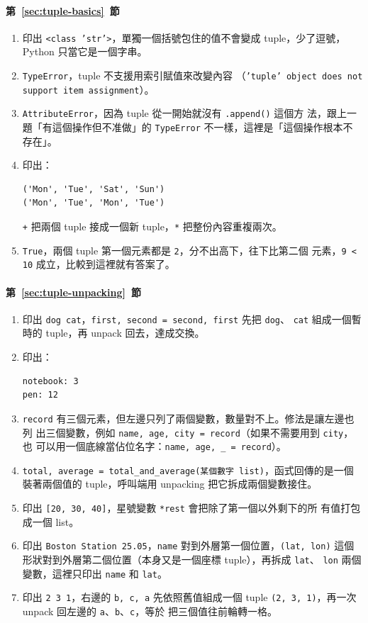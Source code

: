\paragraph{第~\ref{sec:tuple-basics}~節}
\begin{enumerate}
\item 印出 \texttt{<class 'str'>}，單獨一個括號包住的值不會變成 tuple，少了逗號，
Python 只當它是一個字串。
\item \texttt{TypeError}，tuple 不支援用索引賦值來改變內容
（\texttt{'tuple' object does not support item assignment}）。
\item \texttt{AttributeError}，因為 tuple 從一開始就沒有 \texttt{.append()} 這個方
法，跟上一題「有這個操作但不准做」的 \texttt{TypeError} 不一樣，這裡是「這個操作根本不
存在」。
\item 印出：
\begin{verbatim}
('Mon', 'Tue', 'Sat', 'Sun')
('Mon', 'Tue', 'Mon', 'Tue')
\end{verbatim}
\texttt{+} 把兩個 tuple 接成一個新 tuple，\texttt{*} 把整份內容重複兩次。
\item \texttt{True}，兩個 tuple 第一個元素都是 \texttt{2}，分不出高下，往下比第二個
元素，\texttt{9 < 10} 成立，比較到這裡就有答案了。
\end{enumerate}

\paragraph{第~\ref{sec:tuple-unpacking}~節}
\begin{enumerate}
\item 印出 \texttt{dog cat}，\texttt{first, second = second, first} 先把 \texttt{dog}、
\texttt{cat} 組成一個暫時的 tuple，再 unpack 回去，達成交換。
\item 印出：
\begin{verbatim}
notebook: 3
pen: 12
\end{verbatim}
\item \texttt{record} 有三個元素，但左邊只列了兩個變數，數量對不上。修法是讓左邊也列
出三個變數，例如 \texttt{name, age, city = record}（如果不需要用到 \texttt{city}，也
可以用一個底線當佔位名字：\texttt{name, age, \_ = record}）。
\item \texttt{total, average = total\_and\_average(某個數字 list)}，函式回傳的是一個
裝著兩個值的 tuple，呼叫端用 unpacking 把它拆成兩個變數接住。
\item 印出 \texttt{[20, 30, 40]}，星號變數 \texttt{*rest} 會把除了第一個以外剩下的所
有值打包成一個 list。
\item 印出 \texttt{Boston Station 25.05}，\texttt{name} 對到外層第一個位置，\texttt{(lat, lon)}
這個形狀對到外層第二個位置（本身又是一個座標 tuple），再拆成 \texttt{lat}、
\texttt{lon} 兩個變數，這裡只印出 \texttt{name} 和 \texttt{lat}。
\item 印出 \texttt{2 3 1}，右邊的 \texttt{b, c, a} 先依照舊值組成一個 tuple
\texttt{(2, 3, 1)}，再一次 unpack 回左邊的 \texttt{a}、\texttt{b}、\texttt{c}，等於
把三個值往前輪轉一格。
\end{enumerate}

